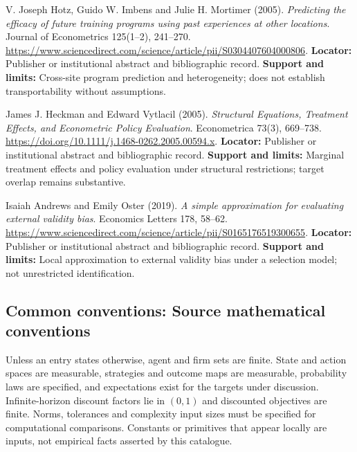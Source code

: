 \documentclass[11pt,a4paper]{article}
\begin{document}
\begin{enumerate}[label={[\textnormal{S}\arabic*]},leftmargin=*]

\item V. Joseph Hotz, Guido W. Imbens and Julie H. Mortimer (2005). \emph{Predicting the efficacy of future training programs using past experiences at other locations}. Journal of Econometrics 125(1–2), 241–270. \url{https://www.sciencedirect.com/science/article/pii/S0304407604000806}. \textbf{Locator:} Publisher or institutional abstract and bibliographic record. \textbf{Support and limits:} Cross-site program prediction and heterogeneity; does not establish transportability without assumptions.

\item James J. Heckman and Edward Vytlacil (2005). \emph{Structural Equations, Treatment Effects, and Econometric Policy Evaluation}. Econometrica 73(3), 669–738. \url{https://doi.org/10.1111/j.1468-0262.2005.00594.x}. \textbf{Locator:} Publisher or institutional abstract and bibliographic record. \textbf{Support and limits:} Marginal treatment effects and policy evaluation under structural restrictions; target overlap remains substantive.

\item Isaiah Andrews and Emily Oster (2019). \emph{A simple approximation for evaluating external validity bias}. Economics Letters 178, 58–62. \url{https://www.sciencedirect.com/science/article/pii/S0165176519300655}. \textbf{Locator:} Publisher or institutional abstract and bibliographic record. \textbf{Support and limits:} Local approximation to external validity bias under a selection model; not unrestricted identification.

\end{enumerate}

\subsection*{Common conventions: Source mathematical conventions}

Unless an entry states otherwise, agent and firm sets are finite. State and action spaces are measurable, strategies and outcome maps are measurable, probability laws are specified, and expectations exist for the targets under discussion. Infinite-horizon discount factors lie in $(0,1)$ and discounted objectives are finite. Norms, tolerances and complexity input sizes must be specified for computational comparisons. Constants or primitives that appear locally are inputs, not empirical facts asserted by this catalogue.
\end{document}
